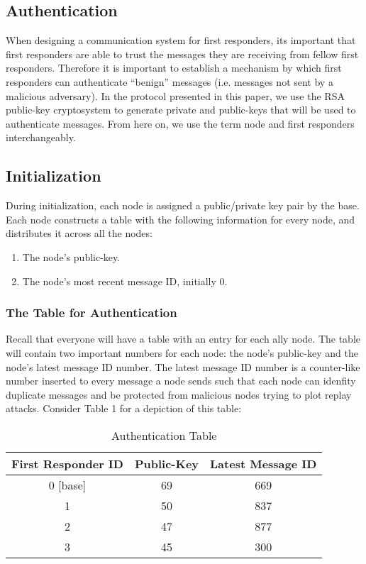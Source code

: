 \documentclass[letterpaper]{article}
\begin{document}
\subsection{Authentication}
When designing a communication system for first responders, its important that first responders are able to trust the messages they are receiving from fellow first responders. Therefore it is important to establish a mechanism by which first responders can authenticate “benign” messages (i.e. messages not sent by a malicious adversary). In the protocol presented in this paper, we use the RSA public-key cryptosystem to generate private and public-keys that will be used to authenticate messages. From here on, we use the term node and first responders interchangeably.

\subsection{Initialization}
During initialization, each node is assigned a public/private key pair by the base. Each node constructs a table with the following information for every node, and distributes it across all the nodes:

\begin{enumerate}
  \item The node's public-key. 
  \item The node's most recent message ID, initially 0.
\end{enumerate}

\subsubsection{The Table for Authentication}
Recall that everyone will have a table with an entry for each ally node. The table will contain two important numbers for each node: the node's public-key and the node's latest message ID number. The latest message ID number is a counter-like number inserted to every message a node sends such that each node can idenfity duplicate messages and be protected from malicious nodes trying to plot replay attacks. Consider Table 1 for a depiction of this table:

\begin{table}[ht]
\caption{Authentication Table} %
\centering %
\begin{tabular}{c c c } %
\hline
\hline %
First Responder ID & Public-Key & Latest Message ID  \\[0.5ex] %
\hline %
0 [base] & 69 & 669\\
1 & 50 & 837\\
2 & 47 & 877 \\
3 & 45 & 300\\ [1ex]
\hline
\end{tabular}
\label{table:nonlin}
\end{table}
\end{document}
